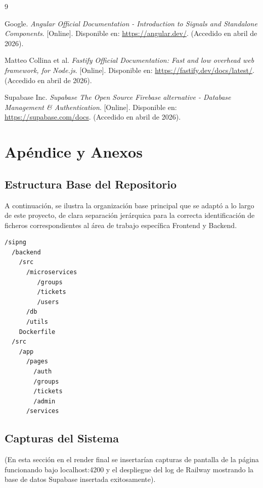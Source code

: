 \documentclass[12pt,a4paper]{report}
\begin{document}
\begin{thebibliography}{9}

Google. \textit{Angular Official Documentation - Introduction to Signals and Standalone Components}. [Online]. Disponible en: \url{https://angular.dev/}. (Accedido en abril de 2026).

Matteo Collina et al. \textit{Fastify Official Documentation: Fast and low overhead web framework, for Node.js}. [Online]. Disponible en: \url{https://fastify.dev/docs/latest/}. (Accedido en abril de 2026).

Supabase Inc. \textit{Supabase The Open Source Firebase alternative - Database Management \& Authentication}. [Online]. Disponible en: \url{https://supabase.com/docs}. (Accedido en abril de 2026).

\end{thebibliography}

\appendix
\chapter{Apéndice y Anexos}

\section{Estructura Base del Repositorio}
A continuación, se ilustra la organización base principal que se adaptó a lo largo de este proyecto, de clara separación jerárquica para la correcta identificación de ficheros correspondientes al área de trabajo específica Frontend y Backend.

\begin{verbatim}
/sipng
  /backend
    /src
      /microservices
         /groups
         /tickets
         /users
      /db
      /utils
    Dockerfile
  /src
    /app
      /pages
        /auth
        /groups
        /tickets
        /admin
      /services
\end{verbatim}

\section{Capturas del Sistema}
(En esta sección en el render final se insertarían capturas de pantalla de la página funcionando bajo localhost:4200 y el despliegue del log de Railway mostrando la base de datos Supabase insertada exitosamente).
\end{document}
